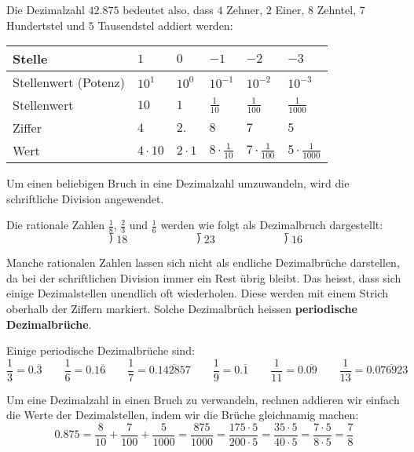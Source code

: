 Die Dezimalzahl $42.875$ bedeutet also, dass $4$ Zehner, $2$ Einer, $8$ Zehntel, $7$ Hundertstel und $5$ Tausendstel addiert werden:
\begin{center}
  \renewcommand{\arraystretch}{1.3}
  \begin{tabularx}{0.9\textwidth}{lCCCCC}
  \toprule
    Stelle & $1$ & $0$ & $-1$ & $-2$ & $-3$ \\
  \midrule
    Stellenwert (Potenz) & $10^{1}$ & $10^{0}$ & $10^{-1}$ & $10^{-2}$ & $10^{-3}$ \\
  \midrule
    Stellenwert & $10$ & $1$ & $\frac{1}{10}$ & $\frac{1}{100}$ & $\frac{1}{1000}$ \\
  \midrule
    Ziffer & $4$ & $2.$ & $8$ & $7$ & $5$ \\
  \midrule
    Wert & $4\cdot 10$ & $2\cdot 1$ & $8\cdot\frac{1}{10}$ & $7\cdot\frac{1}{100}$ & $5\cdot\frac{1}{1000}$ \\
  \bottomrule
  \end{tabularx}
\end{center}
Um einen beliebigen Bruch in eine Dezimalzahl umzuwandeln, wird die schriftliche Division angewendet.
\begin{example}
  Die rationale Zahlen $\frac{1}{8}$, $\frac{2}{3}$ und $\frac{1}{6}$ werden wie folgt als Dezimalbruch dargestellt:
  \[
    \longdivision{1}{8} \qquad\qquad\qquad \longdivision{2}{3} \qquad\qquad\qquad \longdivision{1}{6}
  \]
\end{example}
Manche rationalen Zahlen lassen sich nicht als endliche Dezimalbrüche darstellen, da bei der schriftlichen Division immer ein Rest übrig bleibt. Das heisst, dass sich einige Dezimalstellen unendlich oft wiederholen. Diese werden mit einem Strich oberhalb der Ziffern markiert. Solche Dezimalbrüch heissen \textbf{periodische Dezimalbrüche}.
\begin{example}
  Einige periodische Dezimalbrüche sind:
  \[
    \frac{1}{3} = 0.\overline{3} \qquad
    \frac{1}{6} = 0.1\overline{6} \qquad
    \frac{1}{7} = 0.\overline{142857} \qquad
    \frac{1}{9} = 0.\overline{1} \qquad
    \frac{1}{11} = 0.\overline{09} \qquad
    \frac{1}{13} = 0.\overline{076923}
  \]
\end{example}
Um eine Dezimalzahl in einen Bruch zu verwandeln, rechnen addieren wir einfach die Werte der Dezimalstellen, indem wir die Brüche gleichnamig machen:
\[
  0.875 = \frac{8}{10} + \frac{7}{100} + \frac{5}{1000} = \frac{875}{1000} =\frac{175\cdot 5}{200\cdot 5} = \frac{35\cdot 5}{40\cdot 5} = \frac{7\cdot 5}{8\cdot 5} = \frac{7}{8}
\]
